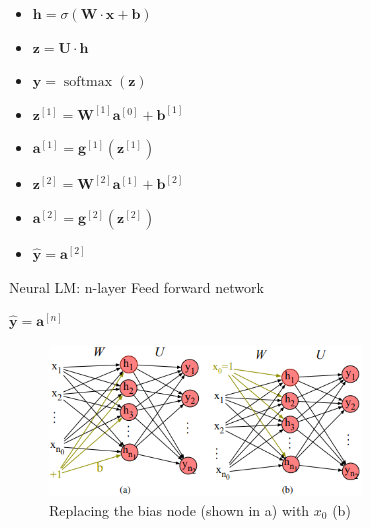 \begin{table}[H]
    \begin{minipage}{3.5cm}
        \begin{itemize}
            \item $\mathbf{h} = \sigma(\mathbf{W}\cdot \mathbf{x} + \mathbf{b})$
            \item $\mathbf{z} = \mathbf{U} \cdot \mathbf{h}$
            \item $\mathbf{y} = \operatorname{softmax}(\mathbf{z})$
        \end{itemize}
    \end{minipage}
    \hfill
    \begin{minipage}{4.2cm}
        \begin{itemize}
            \item $\mathbf{z}^{[1]} = \mathbf{W}^{[1]}\mathbf{a}^{[0]} +\mathbf{b}^{[1]}$
            \vspace{0.15cm}
            \item $\mathbf{a}^{[1]} = \mathbf{g}^{[1]}(\mathbf{z}^{[1]})$
            \vspace{0.15cm}
            \item $\mathbf{z}^{[2]} = \mathbf{W}^{[2]}\mathbf{a}^{[1]} +\mathbf{b}^{[2]}$
            \vspace{0.15cm}
            \item $\mathbf{a}^{[2]} = \mathbf{g}^{[2]}(\mathbf{z}^{[2]})$
            \vspace{0.15cm}
            \item $\mathbf{\hat{y}} = \mathbf{a}^{[2]}$
        \end{itemize}
    \end{minipage}
    \hfill
    \begin{minipage}{6cm}
        \begin{algorithm}[H]
            \caption{Neural LM: n-layer Feed forward network}
            
            $\mathbf{\hat{y}} = \mathbf{a}^{[n]}$\;
        \end{algorithm}
    \end{minipage}
\end{table}

\begin{figure}[H]
    \centering
    \includegraphics[height=4cm]{Pictures/nlp/neural-nn-replace_bias.png}
    \caption{Replacing the bias node (shown in a) with $x_0$ (b)}
\end{figure}

